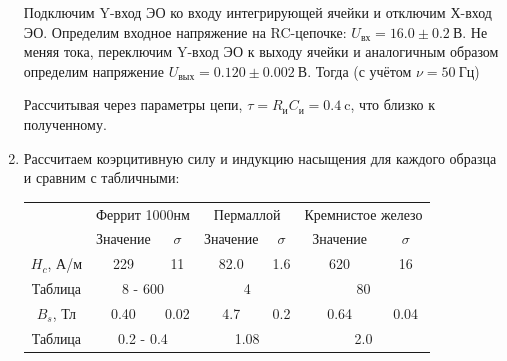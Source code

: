\documentclass[a4paper,12pt]{article}
\begin{document}
\begin{enumerate}
Подключим Y-вход ЭО ко входу интегрирующей ячейки и отключим Х-вход ЭО. Определим входное напряжение на RC-цепочке: $U_{\text{вх}} = 16.0 \pm 0.2~\text{В}$.
Не меняя тока, переключим Y-вход ЭО к выходу ячейки  и аналогичным образом определим напряжение $U_{\text{вых}}= 0.120 \pm 0.002~\text{В}$. Тогда (с учётом $\nu = 50~\text{Гц}$)
\begin{center}
\end{center}
Рассчитывая через параметры цепи, $\tau = R_\text{и} C_\text{и} = 0.4~\text{c}$, что близко к полученному.

\item  Рассчитаем коэрцитивную силу и индукцию насыщения для каждого образца и сравним с табличными:
\begin{table}[h]
\centering
\begin{tabular}{|c|c|c||c|c||c|c|}
\hline
\multirow{2}{*}{} & \multicolumn{2}{c||}{Феррит 1000нм} & \multicolumn{2}{c||}{Пермаллой} & \multicolumn{2}{c|}{Кремнистое железо} \\ \cline{2-7} 
                  & Значение         & $\sigma$           & Значение       & $\sigma$          & Значение           & $\sigma$              \\ \hline
$H_c$, А/м           & 229         & 11        & 82.0     & 1.6      & 620           & 16          \\ \hline
Таблица           & \multicolumn{2}{c||}{8 - 600}           & \multicolumn{2}{c||}{4}  & \multicolumn{2}{c|}{80}              \\ \hline
$B_s$, Тл            & 0.40              & 0.02        & 4.7 & 0.2      & 0.64               & 0.04         \\ \hline
Таблица           & \multicolumn{2}{c||}{0.2 - 0.4}           & \multicolumn{2}{c||}{1.08}  & \multicolumn{2}{c|}{2.0}              \\ \hline
\end{tabular}
\end{table}
\end{enumerate}
\end{document}
